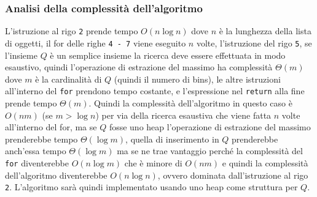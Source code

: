 \subsubsection{Analisi della complessità dell'algoritmo}
L'istruzione al rigo \texttt{2} prende tempo $ O(n \log{}n) $ dove $ n $ è la lunghezza della lista di oggetti, il for delle righe \texttt{4 - 7} viene eseguito $ n $
volte, l'istruzione del rigo \texttt{5}, se l'insieme $ Q $ è un semplice insieme la ricerca deve essere effettuata in modo esaustivo, quindi l'operazione di estrazione del 
massimo ha complessità $ \Theta(m) $ dove $ m $ è la cardinalità di $ Q $ (quindi il numero di bins), le altre istruzioni all'interno del \texttt{for} prendono tempo costante, e 
l'espressione nel \texttt{return} alla fine prende tempo $ \Theta(m) $. Quindi la complessità dell'algoritmo in questo caso è $ O(nm) $ (se $ m > \log{}n $) per via della 
ricerca esaustiva che viene fatta $ n $ volte all'interno del for, ma se $ Q $ fosse uno heap l'operazione di estrazione del massimo prenderebbe tempo $ \Theta(\log{}m) $, 
quella di inserimento in $ Q $ prenderebbe anch'essa tempo $ \Theta(\log{}m) $ ma se ne trae vantaggio perché la complessità del \texttt{for} diventerebbe $ O(n \log{}m) $ che è minore di $ O(nm) $
e quindi la complessità dell'algoritmo diventerebbe $ O(n \log{}n) $, ovvero dominata dall'istruzione al rigo \texttt{2}. L'algoritmo sarà quindi implementato usando uno heap
come struttura per $ Q $.

